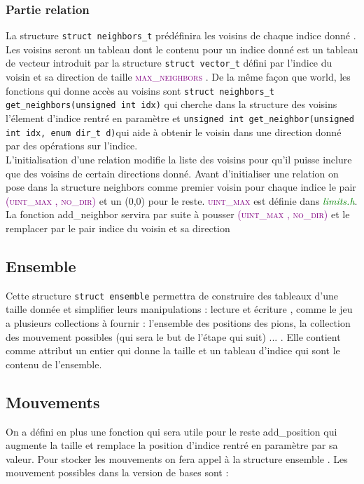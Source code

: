 \documentclass[a4paper]{article}
\begin{document}
\subsubsection{Partie relation}
La structure \lstinline|struct neighbors_t| prédéfinira les voisins de chaque indice donné . Les voisins seront un tableau dont le contenu pour un indice donné est un tableau de vecteur introduit par la structure \lstinline|struct vector_t| défini par l’indice du voisin et sa direction de taille \textcolor{purple}{\textsc{max\_neighbors}} . De la même façon que world, les fonctions qui donne accès au voisins sont \lstinline|struct neighbors_t get_neighbors(unsigned int idx)| qui cherche dans la structure des voisins l’élement d’indice rentré en paramètre et \lstinline|unsigned int get_neighbor(unsigned int idx, enum dir_t d)|qui aide à obtenir le voisin dans une direction donné par des opérations sur l’indice.\\ 

L’initialisation d’une relation modifie la liste des voisins pour qu’il puisse inclure que des voisins de certain directions donné. Avant d’initialiser une relation on pose dans la structure neighbors comme premier voisin pour chaque indice le pair \textcolor{purple}{\textsc{(uint\_max , no\_dir)}} et un (0,0) pour le reste. \textcolor{purple}{\textsc{uint\_max}} est définie dans \textcolor{green}{\textit{limits.h}}. La fonction add\_neighbor servira par suite à pousser \textcolor{purple}{\textsc{(uint\_max , no\_dir)}} et le remplacer par le pair indice du voisin et sa direction 
\subsection{Ensemble}
Cette structure \lstinline|struct ensemble|  permettra de construire des tableaux d’une taille donnée et simplifier leurs manipulations : lecture et écriture , comme le jeu a plusieurs collections à fournir : l’ensemble des positions des pions, la collection des mouvement possibles (qui sera le but de l’étape qui suit) ... . Elle contient comme attribut un entier qui donne la taille et un tableau d'indice qui sont le contenu de l'ensemble.
\subsection{Mouvements}
On a défini en plus une fonction qui sera utile pour le reste add\_position qui augmente la taille et remplace la position d’indice rentré en paramètre par sa valeur. 
Pour stocker les mouvements on fera appel à la structure ensemble . Les mouvement possibles dans la version de bases sont :  
\end{document}
